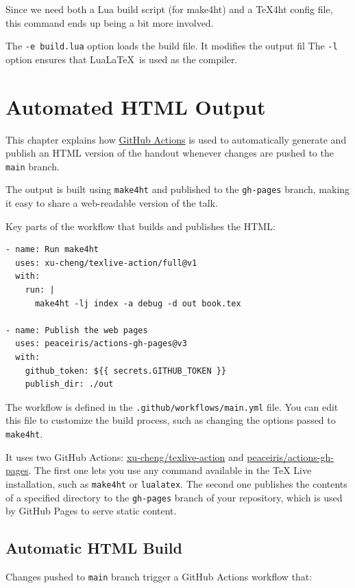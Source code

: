 \documentclass{book}
\begin{document}
Since we need both a Lua build script (for make4ht) and a \TeX4ht config file, this command ends up being a bit more involved.

The \verb|-e build.lua| option loads the build file. It modifies the output fil
The \verb|-l| option  ensures that Lua\LaTeX\ is used as the compiler. 



\chapter{Automated HTML Output}

This chapter explains how \href{https://docs.github.com/en/actions/writing-workflows/quickstart}{GitHub Actions}
is used to automatically generate and publish an HTML version of the handout whenever changes are pushed to the \texttt{main} branch.

The output is built using \texttt{make4ht} and published to the \texttt{gh-pages} branch,
making it easy to share a web-readable version of the talk.

Key parts of the workflow that builds and publishes the HTML:

\begin{verbatim}
- name: Run make4ht
  uses: xu-cheng/texlive-action/full@v1
  with:
    run: |
      make4ht -lj index -a debug -d out book.tex

- name: Publish the web pages
  uses: peaceiris/actions-gh-pages@v3
  with:
    github_token: ${{ secrets.GITHUB_TOKEN }}
    publish_dir: ./out
\end{verbatim}



The workflow is defined in the \texttt{.github/workflows/main.yml} file.
You can edit this file to customize the build process, such as changing the options passed to \texttt{make4ht}.

It uses two GitHub Actions: \href{https://github.com/xu-cheng/texlive-action}{xu-cheng/texlive-action}
and \href{https://github.com/peaceiris/actions-gh-pages}{peaceiris/actions-gh-pages}.
The first one lets you use any command available in the TeX Live installation, such as \texttt{make4ht} or \texttt{lualatex}.
The second one publishes the contents of a specified directory to the \texttt{gh-pages} branch of your repository,
which is used by GitHub Pages to serve static content.



\section{Automatic HTML Build}
Changes pushed to \texttt{main} branch trigger a GitHub Actions workflow that:
\end{document}
